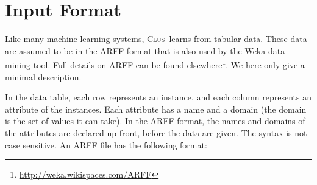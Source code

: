\documentclass[a4paper]{report}
\newcommand{\clus}{\textsc{Clus}}
\begin{document}
% 
% 
% 
%  
% 
% 
% 

\chapter{Input Format}
\label{ch:data}

Like many machine learning systems, \clus\ learns from tabular data. These data are assumed to be in the ARFF format that is also used by the Weka data mining tool.  Full details on ARFF can be found elsewhere\footnote{\url{http://weka.wikispaces.com/ARFF}}. We here only give a minimal description.

In the data table, each row represents an instance, and each column represents an attribute of the instances.  Each attribute has a name and a domain (the domain is the set of values it can take). In the ARFF format, the names and domains of the attributes are declared up front, before the data are given. The syntax is not case sensitive.
%
An ARFF file has the following format:
\end{document}
